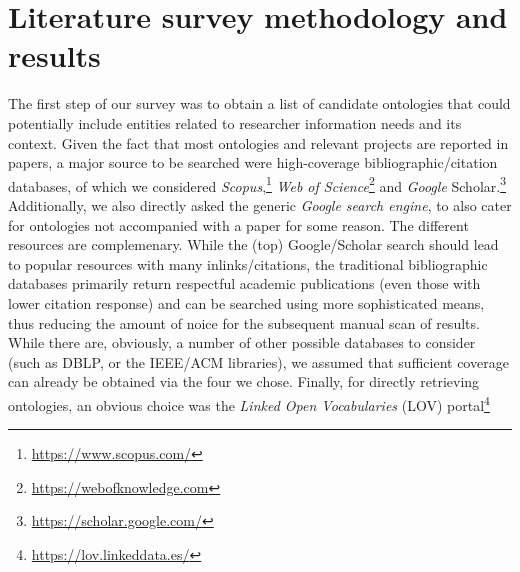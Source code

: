 \section{Literature survey methodology and results}
\label{section:2}

The first step of our survey was to obtain a list of candidate ontologies that could potentially include entities related to researcher information needs and its context.
%
Given the fact that most ontologies and relevant projects are %
reported in %
papers, %
a major source to be searched were high-coverage bibliographic/citation databases, of which we considered \emph{Scopus},\footnote{\url{https://www.scopus.com/}}
\emph{Web of Science}\footnote{\url{https://webofknowledge.com}}
and \emph{Google} Scholar.\footnote{\url{https://scholar.google.com/}}
Additionally, we also directly asked the generic \emph{Google search engine}, to also cater for ontologies not accompanied with a paper for some reason.
The different resources are complemenary.
While the (top) Google/Scholar search should lead to popular resources with many inlinks/citations, the traditional bibliographic databases primarily return respectful academic publications (even those with lower citation response) and can be searched using more sophisticated means, thus reducing the amount of noice for the subsequent manual scan of results.
While there are, obviously, a number of other possible databases to consider (such as DBLP, or the IEEE/ACM libraries), we assumed that sufficient coverage can already be obtained via the four we chose.
Finally, for directly retrieving ontologies, an obvious choice was the \emph{Linked Open Vocabularies} (LOV) portal\footnote{\url{https://lov.linkeddata.es/}} 

